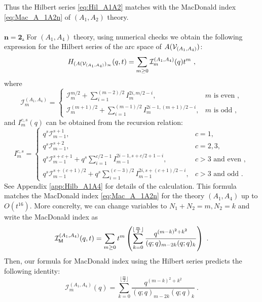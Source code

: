 \documentclass[a4paper,10pt]{article}
\newcommand{\mr}[1]{\mathsf{#1}}
\def\CI {{\cal I}}
\def\CV {{\cal V}}
\def\CI {{{\cal I}}}
\begin{document}
Thus the Hilbert series \eqref{eq:Hil_A1A2} matches with the MacDonald index \eqref{eq:Mac_A_1A2n} of $(A_1,A_2)$ theory. 
\\\\
\underline{$\boldsymbol{n=2}$.} For $(A_1,A_4)$ theory, using numerical checks we obtain the following expression for the Hilbert series of the arc space of $A(\CV_{(A_1,A_4)})$:
\begin{equation}
H_{(A(\CV_{(A_1,A_4)})_\infty}(q,t)=\sum_{m \geq 0}\CI^{(A_1,A_4)}_m(q) t^m~,   
\end{equation}
where 
\begin{equation}
    \mathcal{I}_m^{\left(A_1, A_4\right)}= \begin{cases}\mathcal{I}_m^{m / 2}+\sum_{i=1}^{(m-2) / 2} I_m^{2 i, m / 2-i}, & m \text { is even }, \\ \mathcal{I}_m^{(m+1) / 2}+\sum_{i=1}^{(m-1) / 2} I_m^{2 i-1,(m+1) / 2-i}, & m \text { is odd } ,\end{cases}
\end{equation}
and $I_m^{c,s}(q)$ can be obtained from the recursion relation:
\begin{equation}
I_m^{c, s}= \begin{cases}q^s \mathcal{I}_{m-1}^{s+1}, & c=1, \\ q^s \mathcal{I}_{m-1}^{s+2}, & c=2,3, \\ q^s \mathcal{I}_{m-1}^{s+c+1}+q^s \sum_{i=1}^{c / 2-1} I_{m-1}^{2 i-1, s+c / 2+1-i}, & c>3 \text { and even }, \\ q^s \mathcal{I}_{m-1}^{s+(c+1) / 2}+q^s \sum_{i=1}^{(c-3) / 2} I_{m-1}^{2 i, s+(c+1) / 2-i}, & c>3 \text { and odd~. }\end{cases}    
\end{equation}
See Appendix \ref{app:Hilb_A1A4} for details of the calculation. 
This formula matches the MacDonald index \eqref{eq:Mac_A_1A2n} for the theory $(A_1,A_4)$ up to $O(t^{16})$. More concrelty, we can change variables to $N_1+N_2=m,N_2=k$ and write the MacDonald index as
\begin{equation}
    \CI_{\mr{M}}^{(A_1,A_4)}(q,t)=\sum_{m\geq 0}t^m\left(\sum_{k=0}^{\lfloor\frac{m}{2}\rfloor}\frac{q^{(m-k)^2+k^2}}{(q;q)_{m-2k}(q;q)_k}\right)~.
\end{equation}
Then, our formula for MacDonald index using the Hilbert series predicts the following identity:
\begin{equation}
\mathcal{I}_m^{\left(A_1, A_4\right)}(q)=\sum_{k=0}^{\lfloor\frac{m}{2}\rfloor}\frac{q^{(m-k)^2+k^2}}{(q;q)_{m-2k}(q;q)_k}~.    
\end{equation}
\end{document}
